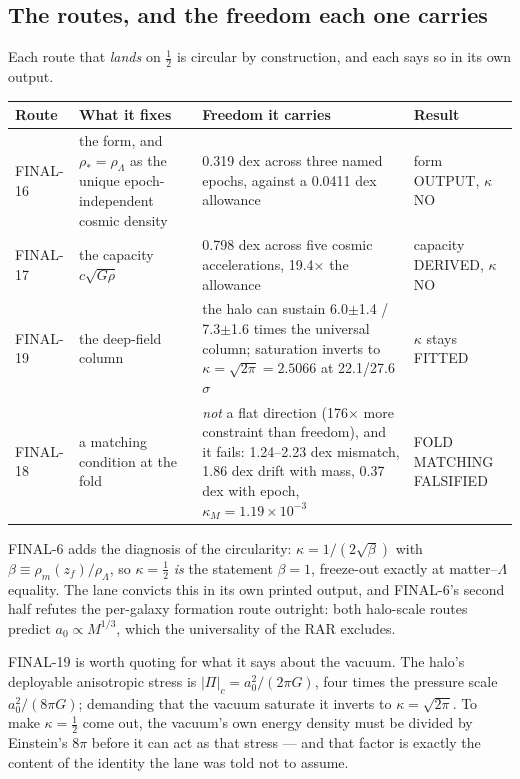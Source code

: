 \documentclass[10pt]{article}
\begin{document}
\subsection{The routes, and the freedom each one carries}
Each route that {\it lands} on $\tfrac12$ is circular by construction, and each says so in its own output.

\begin{center}\small
\begin{tabular}{@{}p{}p{}p{}p{}@{}}\toprule
Route & What it fixes & Freedom it carries & Result\\\midrule
FINAL-16 & the form, and $\rho_*=\rho_\Lambda$ as the unique epoch-independent cosmic density & 0.319 dex across three named epochs, against a 0.0411 dex allowance & form OUTPUT, $\kappa$ NO\\
FINAL-17 & the capacity $c\sqrt{G\rho}$ & 0.798 dex across five cosmic accelerations, 19.4$\times$ the allowance & capacity DERIVED, $\kappa$ NO\\
FINAL-19 & the deep-field column & the halo can sustain 6.0$\pm$1.4 / 7.3$\pm$1.6 times the universal column; saturation inverts to $\kappa=\sqrt{2\pi}=2.5066$ at 22.1/27.6$\sigma$ & $\kappa$ stays FITTED\\
FINAL-18 & a matching condition at the fold & {\it not} a flat direction (176$\times$ more constraint than freedom), and it fails: 1.24--2.23 dex mismatch, 1.86 dex drift with mass, 0.37 dex with epoch, $\kappa_M=1.19\times10^{-3}$ & FOLD MATCHING FALSIFIED\\
\bottomrule
\end{tabular}
\end{center}

FINAL-6 adds the diagnosis of the circularity: $\kappa=1/(2\sqrt\beta)$ with $\beta\equiv\rho_m(z_f)/\rho_\Lambda$,
so $\kappa=\tfrac12$ {\it is} the statement $\beta=1$, freeze-out exactly at matter--$\Lambda$ equality. The lane
convicts this in its own printed output, and FINAL-6's second half refutes the per-galaxy formation route
outright: both halo-scale routes predict $a_0\propto M^{1/3}$, which the universality of the RAR excludes.

FINAL-19 is worth quoting for what it says about the vacuum. The halo's deployable anisotropic stress is
$|\Pi|_c=a_0^2/(2\pi G)$, four times the pressure scale $a_0^2/(8\pi G)$; demanding that the vacuum saturate it
inverts to $\kappa=\sqrt{2\pi}$. To make $\kappa=\tfrac12$ come out, the vacuum's own energy density must be
divided by Einstein's $8\pi$ before it can act as that stress --- and that factor is exactly the content of the
identity the lane was told not to assume.
\end{document}

